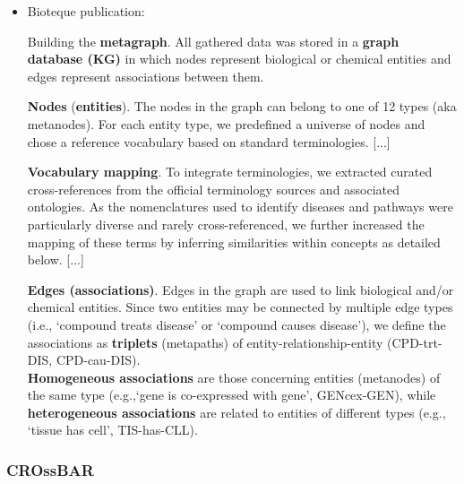 \documentclass{article}
\begin{document}
\begin{itemize}

\item Bioteque publication:
\begin{displayquote}
Building the \textbf{metagraph}. All gathered data was stored in a \textbf{graph database (KG)} in which nodes represent biological or chemical entities and edges represent associations between them.

\textbf{Nodes} (\textbf{entities}). The nodes in the graph can belong to one of 12 types (aka metanodes). For each entity type, we predefined a universe of nodes and chose a reference vocabulary based on standard terminologies. [...]

\textbf{Vocabulary mapping}. To integrate terminologies, we extracted curated cross-references from the official terminology sources and associated ontologies. As the nomenclatures used to identify diseases and pathways were particularly diverse and rarely cross-referenced, we further increased the mapping of these terms by inferring similarities within concepts as detailed below.
[...]

\textbf{Edges (associations)}. Edges in the graph are used to link biological and/or chemical entities. Since two entities may be connected by multiple edge types (i.e., ‘compound treats disease’ or ‘compound causes disease’), we define the associations as \textbf{triplets} (metapaths) of entity-relationship-entity (CPD-trt-DIS, CPD-cau-DIS).\\
\textbf{Homogeneous associations} are those concerning entities (metanodes) of the same type (e.g.,‘gene is co-expressed with gene’, GENcex-GEN), while \textbf{heterogeneous associations} are related to entities of different types (e.g., ‘tissue has cell’, TIS-has-CLL).
\end{displayquote}

\end{itemize}


\subsubsection{CROssBAR}
\end{document}
